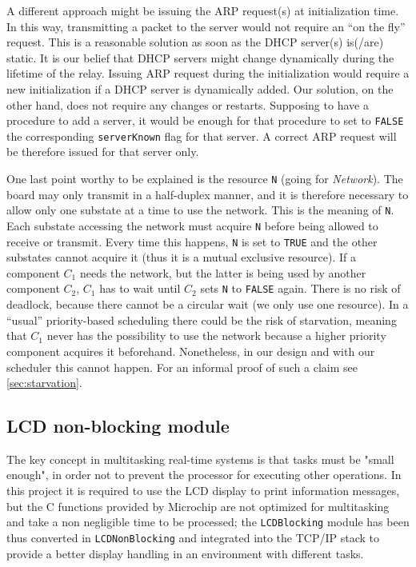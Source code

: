A different approach might be issuing the ARP request(s) at initialization time. In this way, transmitting a packet to the server would not require an ``on the fly'' request. This is a reasonable solution as soon as the DHCP server(s) is(/are) static. It is our belief that DHCP servers might change dynamically during the lifetime of the relay. Issuing ARP request during the initialization would require a new initialization if a DHCP server is dynamically added. Our solution, on the other hand, does not require any changes or restarts. Supposing to have a procedure to add a server, it would be enough for that procedure to set to \texttt{FALSE} the corresponding \texttt{serverKnown} flag for that server. A correct ARP request will be therefore issued for that server only.

One last point worthy to be explained is the resource \texttt{N} (going for \textit{Network}). The board may only transmit in a half-duplex manner, and it is therefore necessary to allow only one substate at a time to use the network. This is the meaning of \texttt{N}. Each substate accessing the network must acquire \texttt{N} before being allowed to receive or transmit. Every time this happens, \texttt{N} is set to \texttt{TRUE} and the other substates cannot acquire it (thus it is a mutual exclusive resource). If a component $C_1$ needs the network, but the latter is being used by another component $C_2$, $C_1$ has to wait until $C_2$ sets \texttt{N} to \texttt{FALSE} again. There is no risk of deadlock, because there cannot be a circular wait (we only use one resource). In a ``usual'' priority-based scheduling there could be the risk of starvation, meaning that $C_1$ never has the possibility to use the network because a higher priority component acquires it beforehand. Nonetheless, in our design and with our scheduler this cannot happen. For an informal proof of such a claim see \ref{sec:starvation}. 

\newpage
\subsection{LCD non-blocking module}
The key concept in multitasking real-time systems is that tasks must be "small enough", in order not to prevent the processor for executing other operations.
In this project it is required to use the LCD display to print information messages, but the C functions provided by Microchip are not optimized for multitasking and take a non negligible time to be processed; the \texttt{LCDBlocking} module has been thus converted in \texttt{LCDNonBlocking} and integrated into the TCP/IP stack to provide a better display handling in an environment with different tasks.\\

